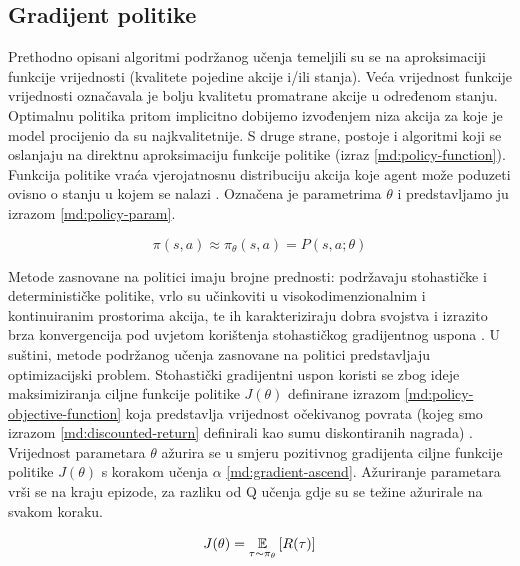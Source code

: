 \subsection{Gradijent politike}


Prethodno opisani algoritmi podržanog učenja temeljili su se na aproksimaciji funkcije vrijednosti (kvalitete  pojedine akcije i/ili stanja). Veća vrijednost funkcije vrijednosti označavala je bolju kvalitetu promatrane akcije u određenom stanju. Optimalnu politika pritom implicitno dobijemo izvođenjem niza akcija za koje je model procijenio da su najkvalitetnije. S druge strane, postoje i algoritmi koji se oslanjaju na direktnu aproksimaciju funkcije politike (izraz \ref{md:policy-function}). Funkcija politike vraća vjerojatnosnu distribuciju akcija koje agent može poduzeti ovisno o stanju u kojem se nalazi \cite{A2C-tensorflow}. Označena je parametrima $\theta$ i predstavljamo ju izrazom \ref{md:policy-param}.

\begin{equation}
    \label{md:policy-param}
    \pi(s, a) \approx \pi_\theta(s,a) = P(s, a; \theta) 
\end{equation}

\bigskip

Metode zasnovane na politici  imaju brojne prednosti: podržavaju stohastičke i determinističke politike, vrlo su učinkoviti u visokodimenzionalnim i kontinuiranim prostorima akcija, te ih karakteriziraju dobra svojstva i izrazito brza konvergencija pod uvjetom korištenja stohastičkog gradijentnog uspona  \cite{PodUceFer}. U suštini, metode podržanog učenja zasnovane na politici predstavljaju optimizacijski problem. Stohastički gradijentni uspon koristi se zbog ideje maksimiziranja ciljne funkcije politike  $J(\theta)$ definirane izrazom \ref{md:policy-objective-function} koja predstavlja vrijednost očekivanog povrata (kojeg smo izrazom \ref{md:discounted-return} definirali kao sumu diskontiranih nagrada) \cite{PolicyGrad}. Vrijednost parametara $\theta$ ažurira se u smjeru pozitivnog gradijenta ciljne funkcije politike $J(\theta)$ s korakom učenja $\alpha$ \ref{md:gradient-ascend}. Ažuriranje parametara vrši se na kraju epizode, za razliku od Q učenja gdje su se težine ažurirale na svakom koraku.

\begin{equation}
    \label{md:policy-objective-function}
    J(\theta) = \operatorname*{\mathbb{E}}_{\tau \sim \pi_\theta} \left[ R(\tau) \right]
\end{equation}


